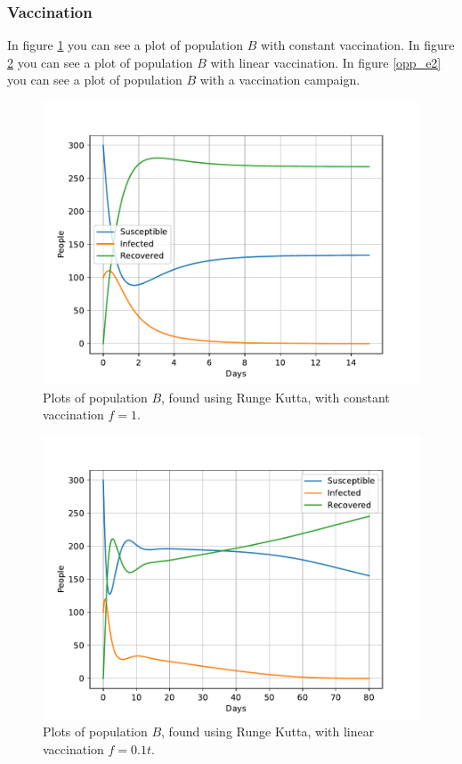 \documentclass[a4paper]{article}
\let\Oldsubsubsection\subsubsection
\renewcommand{\subsubsection}{\FloatBarrier\Oldsubsubsection}
\begin{document}
	
	\subsubsection{Vaccination}
	
	In figure \ref{opp_e0} you can see a plot of population $B$ with constant vaccination. 
	In figure \ref{opp_e1} you can see a plot of population $B$ with linear vaccination. 
	In figure \ref{opp_e2} you can see a plot of population $B$ with a vaccination campaign. 
	
	\begin{figure}[!htb]
		\centering 
		\includegraphics[scale=0.56]{../plots/opp_e_B0.pdf}	
		\caption{Plots of population $B$, found using Runge Kutta, with constant vaccination $f=1$.}
		\label{opp_e0}
	\end{figure}

	\begin{figure}[!htb]
		\centering 
		\includegraphics[scale=0.56]{../plots/opp_e_B2.pdf}	
		\caption{Plots of population $B$, found using Runge Kutta, with linear vaccination $f=0.1 t$.}
		\label{opp_e1}
	\end{figure}	
\end{document}
